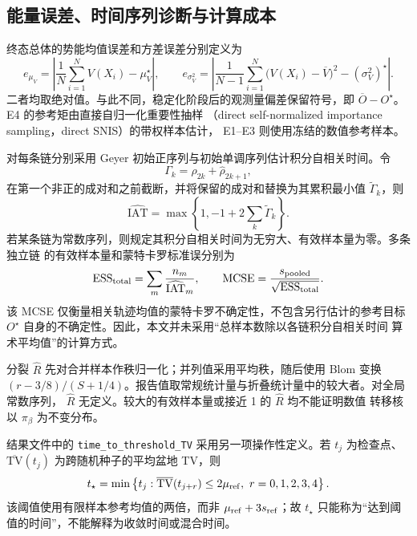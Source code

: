 \documentclass[11pt,a4paper]{article}
\begin{document}
\subsection{能量误差、时间序列诊断与计算成本}

终态总体的势能均值误差和方差误差分别定义为
\begin{equation}
 e_{\mu_V}
 =\left|\frac1N\sum_{i=1}^{N}V(X_i)-\mu_V^\star\right|,
 \qquad
 e_{\sigma_V^2}
 =\left|
 \frac1{N-1}\sum_{i=1}^{N}\bigl(V(X_i)-\overline V\bigr)^2
 -(\sigma_V^2)^\star
 \right|.
\end{equation}
二者均取绝对值。与此不同，稳定化阶段后的观测量偏差保留符号，即
$\overline O-O^\star$。E4 的参考矩由直接自归一化重要性抽样
（direct self-normalized importance sampling，direct SNIS）的带权样本估计，
E1--E3 则使用冻结的数值参考样本。

对每条链分别采用 Geyer 初始正序列与初始单调序列估计积分自相关时间。令
\begin{equation}
 \Gamma_k=\widehat\rho_{2k}+\widehat\rho_{2k+1},
\end{equation}
在第一个非正的成对和之前截断，并将保留的成对和替换为其累积最小值
$\widetilde\Gamma_k$，则
\begin{equation}
 \widehat{\mathrm{IAT}}
 =\max\left\{1,-1+2\sum_k\widetilde\Gamma_k\right\}.
\end{equation}
若某条链为常数序列，则规定其积分自相关时间为无穷大、有效样本量为零。多条独立链
的有效样本量和蒙特卡罗标准误分别为
\begin{equation}
 \mathrm{ESS}_{\rm total}
 =\sum_m\frac{n_m}{\widehat{\mathrm{IAT}}_m},
 \qquad
 \mathrm{MCSE}
 =\frac{s_{\rm pooled}}{\sqrt{\mathrm{ESS}_{\rm total}}}.
\end{equation}
该 MCSE 仅衡量相关轨迹均值的蒙特卡罗不确定性，不包含另行估计的参考目标
$O^\star$ 自身的不确定性。因此，本文并未采用“总样本数除以各链积分自相关时间
算术平均值”的计算方式。

分裂 $\widehat R$ 先对合并样本作秩归一化；并列值采用平均秩，随后使用 Blom 变换
$(r-3/8)/(S+1/4)$。报告值取常规统计量与折叠统计量中的较大者。对全局常数序列，
$\widehat R$ 无定义。较大的有效样本量或接近 1 的 $\widehat R$ 均不能证明数值
转移核以 $\pi_\beta$ 为不变分布。

结果文件中的 \texttt{time\_to\_threshold\_TV} 采用另一项操作性定义。若
$t_j$ 为检查点、$\overline{\mathrm{TV}}(t_j)$ 为跨随机种子的平均盆地 TV，则
\begin{equation}
 t_\star=\min\left\{
 t_j:\overline{\mathrm{TV}}(t_{j+r})\le 2\mu_{\rm ref},
 \ r=0,1,2,3,4
 \right\}.
\end{equation}
该阈值使用有限样本参考均值的两倍，而非 $\mu_{\rm ref}+3s_{\rm ref}$；故
$t_\star$ 只能称为“达到阈值的时间”，不能解释为收敛时间或混合时间。
\end{document}
